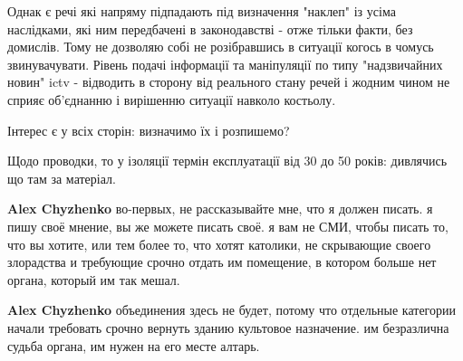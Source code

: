 \begin{itemize}
\begin{itemize}
Однак є речі які напряму підпадають під визначення "наклеп" із усіма
наслідками, які ним передбачені в законодавстві - отже тільки факти, без
домислів. Тому не дозволяю собі не розібравшись в ситуації когось в чомусь
звинувачувати. Рівень подачі інформації та маніпуляції по типу "надзвичайних
новин" ictv - відводить в сторону від реального стану речей і жодним чином не
сприяє об'єднанню і вирішенню ситуації навколо костьолу.

Інтерес є у всіх сторін: визначимо їх і розпишемо?

 
Щодо проводки, то у ізоляції термін експлуатації від 30 до 50 років: дивлячись що там за матеріал.

 
\textbf{Alex Chyzhenko} во-первых, не рассказывайте мне, что я должен писать. я
пишу своё мнение, вы же можете писать своё. я вам не СМИ, чтобы писать то, что
вы хотите, или тем более то, что хотят католики, не скрывающие своего
злорадства и требующие срочно отдать им помещение, в котором больше нет органа,
который им так мешал.

 
\textbf{Alex Chyzhenko} объединения здесь не будет, потому что отдельные категории начали требовать срочно вернуть зданию культовое назначение. им безразлична судьба органа, им нужен на его месте алтарь.

 
\Smiley[1.0][yellow]

\end{itemize}


\end{itemize}

